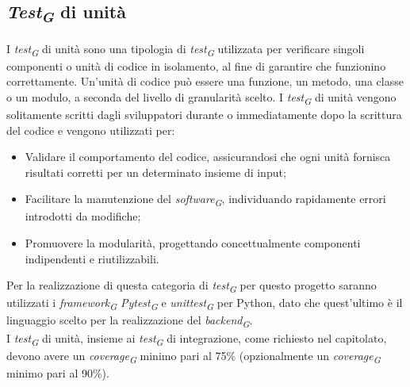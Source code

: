 \subsection{\textit{Test\textsubscript{G}} di unità}
I \textit{test\textsubscript{G}} di unità sono una tipologia di \textit{test\textsubscript{G}} utilizzata per verificare singoli componenti o unità di codice in isolamento, al fine di garantire che funzionino correttamente. Un'unità di codice può essere una funzione, un metodo, una classe o un modulo, a seconda del livello di granularità scelto. I \textit{test\textsubscript{G}} di unità vengono solitamente scritti dagli sviluppatori durante o immediatamente dopo la scrittura del codice e vengono utilizzati per:
\begin{itemize}
    \item Validare il comportamento del codice, assicurandosi che ogni unità fornisca risultati corretti per un determinato insieme di input;
    \item Facilitare la manutenzione del \textit{software\textsubscript{G}}, individuando rapidamente errori introdotti da modifiche;
    \item Promuovere la modularità, progettando concettualmente componenti indipendenti e riutilizzabili.
\end{itemize}
Per la realizzazione di questa categoria di \textit{test\textsubscript{G}} per questo progetto saranno utilizzati i \textit{framework\textsubscript{G}} \textit{Pytest\textsubscript{G}} e \textit{unittest\textsubscript{G}} per Python, dato che quest'ultimo è il linguaggio scelto per la realizzazione del \textit{backend\textsubscript{G}}.\\
I \textit{test\textsubscript{G}} di unità, insieme ai \textit{test\textsubscript{G}} di integrazione, come richiesto nel capitolato, devono avere un \textit{coverage\textsubscript{G}} minimo pari al 75\% (opzionalmente un \textit{coverage\textsubscript{G}} minimo pari al 90\%).


